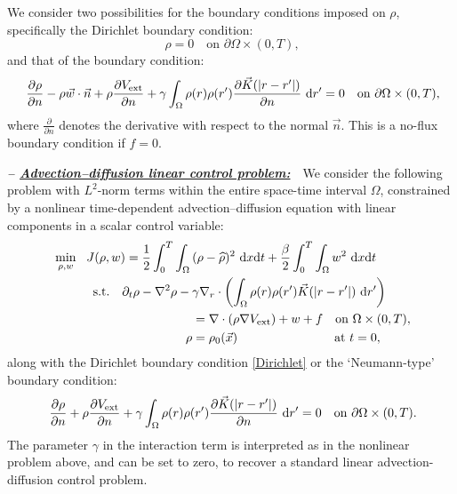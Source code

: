 We consider two possibilities for the boundary conditions imposed on $\rho$, specifically the Dirichlet boundary condition:
\begin{equation}
\ \label{Dirichlet} \rho=0\quad\text{on }\partial\Omega\times(0,T),
\end{equation}
and that of the boundary condition:
\begin{equation}
\ \label{NoFlux} \frac{\partial\rho}{\partial{}n}-\rho\vec{w}\cdot\vec{n}+\rho\frac{\partial{}V_{\text{ext}}}{\partial{}n} +\gamma\int_{\Omega}\rho(r)\rho(r') \frac{ \partial\vec{K}(|r-r'|)}{\partial{}n}~{\rm d}r'=0\quad\text{on }\partial\Omega\times(0,T),
\end{equation}
where $\frac{\partial}{\partial{}n}$ denotes the derivative with respect to the normal $\vec{n}$. This is a no-flux boundary condition if $f=0$.

\vspace{0.75em}

\textbf{\emph{-- \underline{Advection--diffusion linear control problem:}}}~~We consider the following problem with $L^2$-norm terms within the entire space-time interval $\Omega$, constrained by a nonlinear time-dependent advection--diffusion equation with linear components in a scalar control variable:
\begin{align}
\ \label{AdvDiff_Linear} \min_{\rho,{w}}~~J(\rho, {w}) = \frac{1}{2}\int_0^T\int_{\Omega}{}&(\rho-\widehat{\rho})^2~{\rm d}x{\rm d}t+\frac{\beta}{2}\int_0^T\int_{\Omega}w^2~{\rm d}x{\rm d}t \\
\ \nonumber \text{s.t.}\quad\partial_{t}\rho-\nabla^{2}\rho-{}&\gamma\nabla_{r}\cdot\left(\int_{\Omega}\rho(r)\rho(r')\vec{K}(|r-r'|)~{\rm d}r'\right)\\
&\nonumber=\nabla\cdot(\rho\nabla{}V_{\text{ext}})+w+f\quad\text{on }\Omega\times(0,T), \\
\ \nonumber \rho&{}=\rho_{0}(\vec{x})\quad\hspace{6.8em}\text{at }t=0,
\end{align}
along with the Dirichlet boundary condition \eqref{Dirichlet} or the `Neumann-type' boundary condition:
\begin{equation}
\ \label{NoFlux_Linear} \frac{\partial\rho}{\partial{}n}+\rho\frac{\partial{}V_{\text{ext}}}{\partial{}n}+\gamma\int_{\Omega}\rho(r)\rho(r') \frac{ \partial\vec{K}(|r-r'|)}{\partial{}n}~{\rm d}r'=0\quad\text{on }\partial\Omega\times(0,T).
\end{equation}
The parameter $\gamma$ in the interaction term is interpreted as in the nonlinear problem above, and can be set to zero, to recover a standard linear advection-diffusion control problem. 
\vspace{0.75em}

